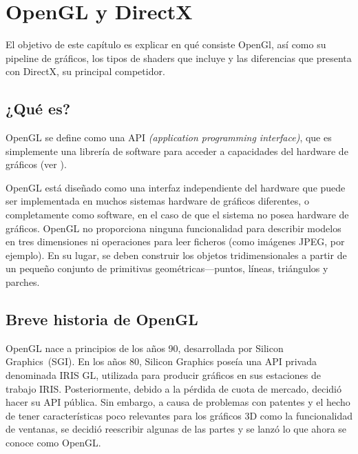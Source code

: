 
\cleardoublepage


\chapter{OpenGL y DirectX}
\label{makereference2}

El objetivo de este capítulo es explicar en qué consiste OpenGl, así como su
pipeline de gráficos, los tipos de shaders que incluye y las diferencias que
presenta con DirectX, su principal competidor.\\

\section{¿Qué es?}
\label{makereference2.1}

OpenGL se define como una API \textit{(application programming interface)}, que
es simplemente una librería de software para acceder a capacidades del hardware
de gráficos (ver \citet{Shreiner:2009:OPG:1696492}).

OpenGL está diseñado como una interfaz independiente del hardware que puede ser
implementada en muchos sistemas hardware de gráficos diferentes, o completamente
como software, en el caso de que el sistema no posea hardware de gráficos.
OpenGL no proporciona ninguna funcionalidad para describir modelos en tres
dimensiones ni operaciones para leer ficheros (como imágenes JPEG, por ejemplo).
En su lugar, se deben construir los objetos tridimensionales a partir de un
pequeño conjunto de primitivas geométricas---puntos, líneas, triángulos y
parches. 

\section{Breve historia de OpenGL}
\label{makereference2.2}

OpenGL nace a principios de los años 90, desarrollada por Silicon Graphics~(SGI).  En
los años 80, Silicon Graphics poseía una API privada denominada IRIS GL,
utilizada para producir gráficos en sus estaciones de trabajo IRIS.
Posteriormente, debido a la pérdida de cuota de mercado, decidió hacer su API
pública. Sin embargo, a causa de problemas con patentes y el hecho de tener
características poco relevantes para los gráficos 3D como la funcionalidad de
ventanas, se decidió reescribir algunas de las partes y se lanzó lo que ahora se
conoce como OpenGL.\\

